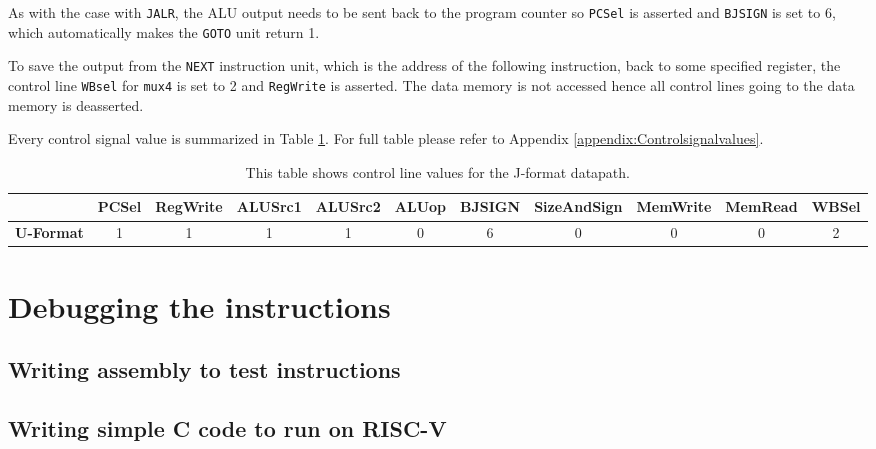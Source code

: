         As with the case with \texttt{JALR}, the ALU output needs to be sent back to the program counter so \texttt{PCSel} is asserted and \texttt{BJSIGN} is set to 6, which automatically makes the \texttt{GOTO} unit return 1.
        
        To save the output from the \texttt{NEXT} instruction unit, which is the address of the following instruction, back to some specified register, the control line \texttt{WBsel} for \texttt{mux4} is set to 2 and \texttt{RegWrite} is asserted. The data memory is not accessed hence all control lines going to the data memory is deasserted.
        
        Every control signal value is summarized in Table \ref{table:JFORMAT}. For full table please refer to Appendix \ref{appendix:Controlsignalvalues}.
         
        
        \begin{table}[h!]
            \small
            \hspace{-2.4cm}
            \begin{tabular}{|c||c|c|c|c|c|c|c|c|c|c|}
            	\hline
            	                  & \textbf{PCSel} & \textbf{RegWrite} & \textbf{ALUSrc1} & \textbf{ALUSrc2} & \textbf{ALUop} & \textbf{BJSIGN} & \textbf{SizeAndSign} & \textbf{MemWrite} & \textbf{MemRead} & \textbf{WBSel} \\ \hline\hline
            	\textbf{U-Format} &       1        &         1         &        1         &        1         &       0        &        6        &          0           &         0         &        0         &       2        \\ \hline
            \end{tabular}
            \caption{This table shows control line values for the J-format datapath.}
            \label{table:JFORMAT}
        \end{table}
    
\section{Debugging the instructions}

    \subsection{Writing assembly to test instructions}
    
    \subsection{Writing simple C code to run on RISC-V}
    
    
    

    